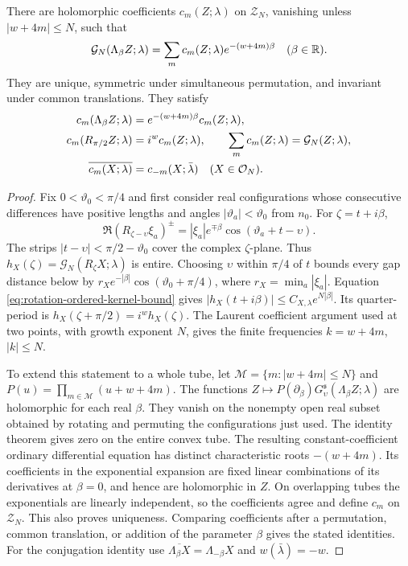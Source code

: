 \begin{proposition}\label{prop:rotation-finite-angular-expansion}
There are holomorphic coefficients $c_m(Z;\lambda)$ on
$\mathcal Z_N$, vanishing unless $|w+4m|\le N$, such that
\begin{equation}\label{eq:rotation-finite-angular-expansion}
 \mathcal G_N(\Lambda_\beta Z;\lambda)
       =\sum_m c_m(Z;\lambda)e^{-(w+4m)\beta}
                         \quad(\beta\in\mathbb R).
\end{equation}
They are unique, symmetric under simultaneous permutation,
and invariant under common translations. They satisfy
\begin{align}
 c_m(\Lambda_\beta Z;\lambda)
       &=e^{-(w+4m)\beta}c_m(Z;\lambda),
                           \label{eq:rotation-angular-coefficient-identities}\\
 c_m(R_{\pi/2}Z;\lambda)&=i^wc_m(Z;\lambda),\qquad
 \sum_m c_m(Z;\lambda)=\mathcal G_N(Z;\lambda),\notag\\
 \overline{c_m(X;\lambda)}&=c_{-m}(X;\bar\lambda)
                           \quad(X\in\mathcal O_N).\notag
\end{align}
\end{proposition}

\begin{proof}
Fix $0<\vartheta_0<\pi/4$ and first consider real configurations
whose consecutive differences have positive lengths and angles
$|\vartheta_a|<\vartheta_0$ from $n_0$.
For $\zeta=t+i\beta$,
\[
 \Re(R_{\zeta-\upsilon}\xi_a)^\pm
       =|\xi_a|e^{\mp\beta}\cos(\vartheta_a+t-\upsilon).
\]
The strips $|t-\upsilon|<\pi/2-\vartheta_0$ cover the complex
$\zeta$-plane. Thus $h_X(\zeta)=\mathcal G_N(R_\zeta X;\lambda)$
is entire. Choosing $\upsilon$ within $\pi/4$ of $t$ bounds every
gap distance below by
$r_Xe^{-|\beta|}\cos(\vartheta_0+\pi/4)$, where
$r_X=\min_a|\xi_a|$.
Equation \eqref{eq:rotation-ordered-kernel-bound} gives
$|h_X(t+i\beta)|\le C_{X,\lambda}e^{N|\beta|}$.
Its quarter-period is $h_X(\zeta+\pi/2)=i^wh_X(\zeta)$.
The Laurent coefficient argument used at two points, with
growth exponent $N$, gives the finite frequencies
$k=w+4m$, $|k|\le N$.

To extend this statement to a whole tube, let
$\mathcal M=\{m:|w+4m|\le N\}$ and
$P(u)=\prod_{m\in\mathcal M}(u+w+4m)$.
The functions
$Z\mapsto P(\partial_\beta)G_\upsilon^{\mathfrak s}
(\Lambda_\beta Z;\lambda)$ are holomorphic for each real $\beta$.
They vanish on the nonempty open real subset obtained by rotating
and permuting the configurations just used.
The identity theorem gives zero on the entire convex tube.
The resulting constant-coefficient ordinary differential equation
has distinct characteristic roots $-(w+4m)$.
Its coefficients in the exponential expansion are fixed linear
combinations of its derivatives at $\beta=0$, and hence are
holomorphic in $Z$.
On overlapping tubes the exponentials are linearly independent,
so the coefficients agree and define $c_m$ on $\mathcal Z_N$.
This also proves uniqueness. Comparing coefficients after a
permutation, common translation, or addition of the parameter
$\beta$ gives the stated identities. For the conjugation identity
use $\overline{\Lambda_\beta X}=\Lambda_{-\beta}X$ and
$w(\bar\lambda)=-w$.
\end{proof}

